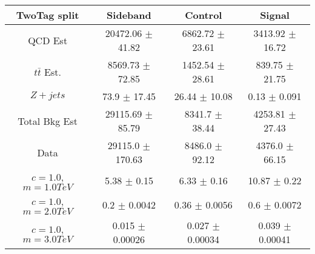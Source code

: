 \begin{footnotesize} 
\begin{tabular}{c|c|c|c} 
TwoTag split & Sideband & Control & Signal \\ 
\hline\hline 
QCD Est & 20472.06 $\pm$ 41.82 & 6862.72 $\pm$ 23.61 & 3413.92 $\pm$ 16.72\\ 
$t\bar{t}$ Est.  & 8569.73 $\pm$ 72.85 & 1452.54 $\pm$ 28.61 & 839.75 $\pm$ 21.75\\ 
$Z+jets$ & 73.9 $\pm$ 17.45 & 26.44 $\pm$ 10.08 & 0.13 $\pm$ 0.091\\ 
Total Bkg Est & 29115.69 $\pm$ 85.79 & 8341.7 $\pm$ 38.44 & 4253.81 $\pm$ 27.43\\ 
Data & 29115.0 $\pm$ 170.63 & 8486.0 $\pm$ 92.12 & 4376.0 $\pm$ 66.15\\ 
$c=1.0$,$m=1.0TeV$ & 5.38 $\pm$ 0.15 & 6.33 $\pm$ 0.16 & 10.87 $\pm$ 0.22\\ 
$c=1.0$,$m=2.0TeV$ & 0.2 $\pm$ 0.0042 & 0.36 $\pm$ 0.0056 & 0.6 $\pm$ 0.0072\\ 
$c=1.0$,$m=3.0TeV$ & 0.015 $\pm$ 0.00026 & 0.027 $\pm$ 0.00034 & 0.039 $\pm$ 0.00041\\ 
\hline\hline 
\end{tabular} 
\end{footnotesize} 
\newline 
